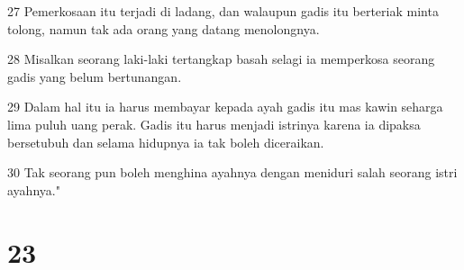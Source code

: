 \par 27 Pemerkosaan itu terjadi di ladang, dan walaupun gadis itu berteriak minta tolong, namun tak ada orang yang datang menolongnya.
\par 28 Misalkan seorang laki-laki tertangkap basah selagi ia memperkosa seorang gadis yang belum bertunangan.
\par 29 Dalam hal itu ia harus membayar kepada ayah gadis itu mas kawin seharga lima puluh uang perak. Gadis itu harus menjadi istrinya karena ia dipaksa bersetubuh dan selama hidupnya ia tak boleh diceraikan.
\par 30 Tak seorang pun boleh menghina ayahnya dengan meniduri salah seorang istri ayahnya."

\chapter{23}

